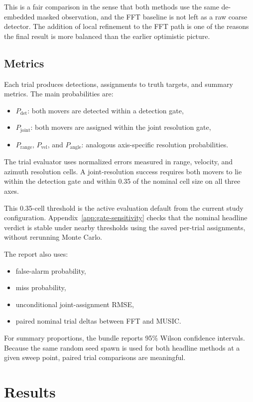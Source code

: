 \documentclass[11pt]{article}
\newcommand{\pdet}{P_{\mathrm{det}}}
\newcommand{\pjoint}{P_{\mathrm{joint}}}
\newcommand{\prange}{P_{\mathrm{range}}}
\newcommand{\pvel}{P_{\mathrm{vel}}}
\newcommand{\pangle}{P_{\mathrm{angle}}}
\begin{document}
This is a fair comparison in the sense that both methods use the same de-embedded masked observation, and the FFT baseline is not left as a raw coarse detector. The addition of local refinement to the FFT path is one of the reasons the final result is more balanced than the earlier optimistic picture.

\subsection{Metrics}

Each trial produces detections, assignments to truth targets, and summary metrics. The main probabilities are:
\begin{itemize}
  \item $\pdet$: both movers are detected within a detection gate,
  \item $\pjoint$: both movers are assigned within the joint resolution gate,
  \item $\prange$, $\pvel$, and $\pangle$: analogous axis-specific resolution probabilities.
\end{itemize}

The trial evaluator uses normalized errors measured in range, velocity, and azimuth resolution cells. A joint-resolution success requires both movers to lie within the detection gate and within 0.35 of the nominal cell size on all three axes.

This 0.35-cell threshold is the active evaluation default from the current study configuration. Appendix~\ref{app:gate-sensitivity} checks that the nominal headline verdict is stable under nearby thresholds using the saved per-trial assignments, without rerunning Monte Carlo.

The report also uses:
\begin{itemize}
  \item false-alarm probability,
  \item miss probability,
  \item unconditional joint-assignment RMSE,
  \item paired nominal trial deltas between FFT and MUSIC.
\end{itemize}

For summary proportions, the bundle reports 95\% Wilson confidence intervals. Because the same random seed spawn is used for both headline methods at a given sweep point, paired trial comparisons are meaningful.

\section{Results}
\end{document}
